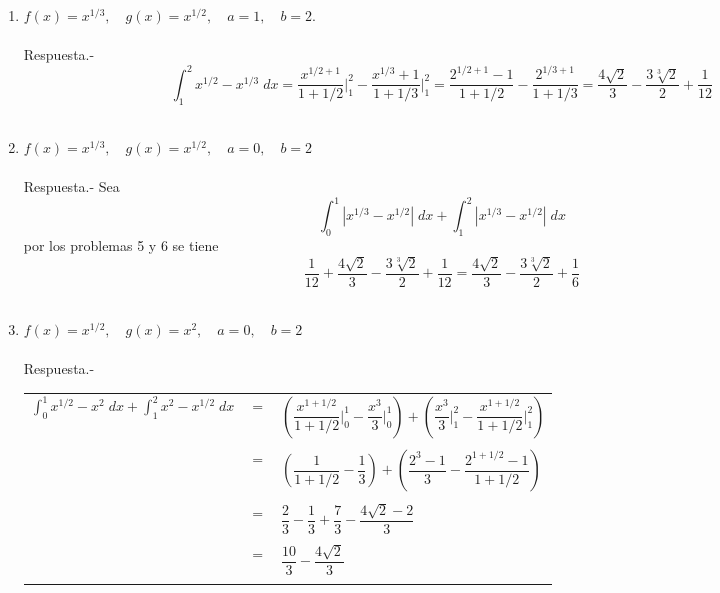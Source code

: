 \begin{enumerate}[\bfseries 1.]
\item $f(x) = x^{1/3}, \quad g(x) = x^{1/2},\quad a=1,\quad b=2.$\\\\
    Respuesta.-\; $$\int_1^2 x^{1/2}-x^{1/3}\; dx = \dfrac{x^{1/2 + 1}}{1 + 1/2}\bigg|_1^2 - \dfrac{x^{1/3}+1}{1+1/3}\bigg|_1^2 = \dfrac{2^{1/2+1}-1}{1+1/2}-\dfrac{2^{1/3+1}}{1+1/3} = \dfrac{4\sqrt{2}}{3}-\dfrac{3\sqrt[3]{2}}{2}+\dfrac{1}{12}$$\\

\item $f(x)=x^{1/3},\quad g(x) = x^{1/2}, \quad a = 0,\quad b=2$\\\\
    Respuesta.-\; Sea $$\int_0^1 |x^{1/3}-x^{1/2}|\; dx + \int_1^2 |x^{1/3}-x^{1/2}|\; dx$$
    por los problemas 5 y 6 se tiene $$\dfrac{1}{12} + \dfrac{4\sqrt{2}}{3}-\dfrac{3\sqrt[3]{2}}{2}+\dfrac{1}{12} = \dfrac{4\sqrt{2}}{3}-\dfrac{3\sqrt[3]{2}}{2}+\dfrac{1}{6}$$\\

\item $f(x) = x^{1/2}, \quad g(x) = x^2, \quad a=0, \quad b=2$\\\\
    Respuesta.-\;
    \begin{center}
	\begin{tabular}{rcl}
	    $\displaystyle\int_0^1 x^{1/2} - x^2 \; dx + \int_1^2 x^2 - x^{1/2}\; dx$ & $=$ & $\left(\dfrac{x^{1+1/2}}{1+1/2}\bigg|_0^1 - \dfrac{x^3}{3}\bigg|_0^1\right) + \left( \dfrac{x^3}{3}\bigg|_1^2 - \dfrac{x^{1+1/2}}{1+1/2}\bigg|_1^2 \right)$\\\\
	    & $=$ & $\left(\dfrac{1}{1+1/2} - \dfrac{1}{3}\right) + \left(\dfrac{2^3-1}{3} - \dfrac{2^{1+1/2} - 1}{1+1/2}\right)$\\\\
	    & $=$ & $\dfrac{2}{3} - \dfrac{1}{3} + \dfrac{7}{3} - \dfrac{4\sqrt{2}-2}{3}$\\\\
	    &$=$&$\dfrac{10}{3}-\dfrac{4\sqrt{2}}{3}$\\\\
	\end{tabular}
    \end{center}


\end{enumerate}
